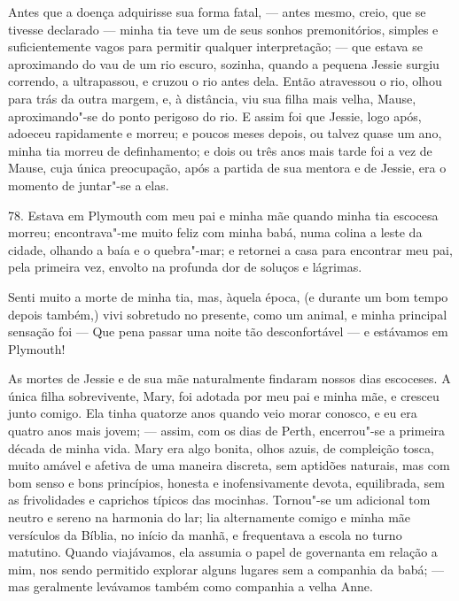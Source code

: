 Antes que a doença adquirisse sua forma fatal, --- antes mesmo, creio,
que se tivesse declarado --- minha tia teve um de seus sonhos
premonitórios, simples e suficientemente vagos para permitir qualquer
interpretação; --- que estava se aproximando do vau de um rio escuro,
sozinha, quando a pequena Jessie surgiu correndo, a ultrapassou, e
cruzou o rio antes dela. Então atravessou o rio, olhou para trás da
outra margem, e, à distância, viu sua filha mais velha, Mause,
aproximando"-se do ponto perigoso do rio. E assim foi que Jessie, logo
após, adoeceu rapidamente e morreu; e poucos meses depois, ou talvez
quase um ano, minha tia morreu de definhamento; e dois ou três anos mais
tarde foi a vez de Mause, cuja única preocupação, após a partida de sua
mentora e de Jessie, era o momento de juntar"-se a elas.

78. Estava em Plymouth com meu pai e minha mãe quando minha tia escocesa
morreu; encontrava"-me muito feliz com minha babá, numa colina a leste da
cidade, olhando a baía e o quebra"-mar; e retornei a casa para encontrar
meu pai, pela primeira vez, envolto na profunda dor de soluços e
lágrimas.

Senti muito a morte de minha tia, mas, àquela época, (e durante um bom
tempo depois também,) vivi sobretudo no presente, como um animal, e
minha principal sensação foi --- Que pena passar uma noite tão
desconfortável --- e estávamos em Plymouth!

As mortes de Jessie e de sua mãe naturalmente findaram nossos dias
escoceses. A única filha sobrevivente, Mary, foi adotada por meu pai e
minha mãe, e cresceu junto comigo. Ela tinha quatorze anos quando veio
morar conosco, e eu era quatro anos mais jovem; --- assim, com os dias de
Perth, encerrou"-se a primeira década de minha vida. Mary era algo
bonita, olhos azuis, de compleição tosca, muito amável e afetiva de uma
maneira discreta, sem aptidões naturais, mas com bom senso e bons
princípios, honesta e inofensivamente devota, equilibrada, sem as
frivolidades e caprichos típicos das mocinhas. Tornou"-se um adicional
tom neutro e sereno na harmonia do lar; lia alternamente comigo e minha
mãe versículos da Bíblia, no início da manhã, e frequentava a escola no
turno matutino. Quando viajávamos, ela assumia o papel de governanta em
relação a mim, nos sendo permitido explorar alguns lugares sem a
companhia da babá; --- mas geralmente levávamos também como companhia a
velha Anne.

